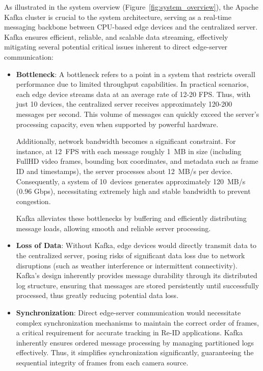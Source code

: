 As illustrated in the system overview (Figure~\ref{fig:system_overview}), the Apache Kafka cluster is crucial to the system architecture, serving as a real-time messaging backbone between CPU-based edge devices and the centralized server. Kafka ensures efficient, reliable, and scalable data streaming, effectively mitigating several potential critical issues inherent to direct edge-server communication:

\begin{itemize}
\item \textbf{Bottleneck}: A bottleneck refers to a point in a system that restricts overall performance due to limited throughput capabilities. In practical scenarios, each edge device streams data at an average rate of 12-20 FPS. Thus, with just 10 devices, the centralized server receives approximately 120-200 messages per second. This volume of messages can quickly exceed the server's processing capacity, even when supported by powerful hardware.

Additionally, network bandwidth becomes a significant constraint. For instance, at 12~FPS with each message roughly 1~MB in size (including FullHD video frames, bounding box coordinates, and metadata such as frame ID and timestamps), the server processes about 12~MB/s per device. Consequently, a system of 10~devices generates approximately 120~MB/s (0.96 Gbps), necessitating extremely high and stable bandwidth to prevent congestion.

Kafka alleviates these bottlenecks by buffering and efficiently distributing message loads, allowing smooth and reliable server processing.

\item \textbf{Loss of Data}: Without Kafka, edge devices would directly transmit data to the centralized server, posing risks of significant data loss due to network disruptions (such as weather interference or intermittent connectivity). Kafka's design inherently provides message durability through its distributed log structure, ensuring that messages are stored persistently until successfully processed, thus greatly reducing potential data loss.

\item \textbf{Synchronization}: Direct edge-server communication would necessitate complex synchronization mechanisms to maintain the correct order of frames, a critical requirement for accurate tracking in Re-ID applications. Kafka inherently ensures ordered message processing by managing partitioned logs effectively. Thus, it simplifies synchronization significantly, guaranteeing the sequential integrity of frames from each camera source.

\end{itemize}

